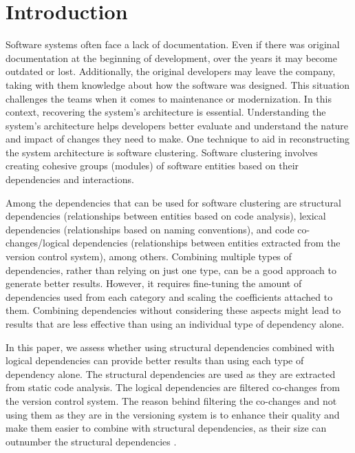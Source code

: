 \documentclass{ieeeaccess}
\begin{document}
\titlepgskip=-21pt

\maketitle

\section{Introduction}
\label{sec:introduction}

Software systems often face a lack of documentation. Even if there was original documentation at the beginning of development, over the years it may become outdated or lost. Additionally, the original developers may leave the company, taking with them knowledge about how the software was designed. This situation challenges the teams when it comes to maintenance or modernization. In this context, recovering the system's architecture is essential. Understanding the system's architecture helps developers better evaluate and understand the nature and impact of changes they need to make. One technique to aid in reconstructing the system architecture is software clustering. Software clustering involves creating cohesive groups (modules) of software entities based on their dependencies and interactions.

Among the dependencies that can be used for software clustering are structural dependencies (relationships between entities based on code analysis), lexical dependencies (relationships based on naming conventions), and code co-changes/logical dependencies (relationships between entities extracted from the version control system), among others. Combining multiple types of dependencies, rather than relying on just one type, can be a good approach to generate better results. However, it requires fine-tuning the amount of dependencies used from each category and scaling the coefficients attached to them. Combining dependencies without considering these aspects might lead to results that are less effective than using an individual type of dependency alone.

In this paper, we assess whether using structural dependencies combined with logical dependencies can provide better results than using each type of dependency alone. The structural dependencies are used as they are extracted from static code analysis. The logical dependencies are filtered co-changes from the version control system. The reason behind filtering the co-changes and not using them as they are in the versioning system is to enhance their quality and make them easier to combine with structural dependencies, as their size can outnumber the structural dependencies \cite{b1}.
\end{document}
